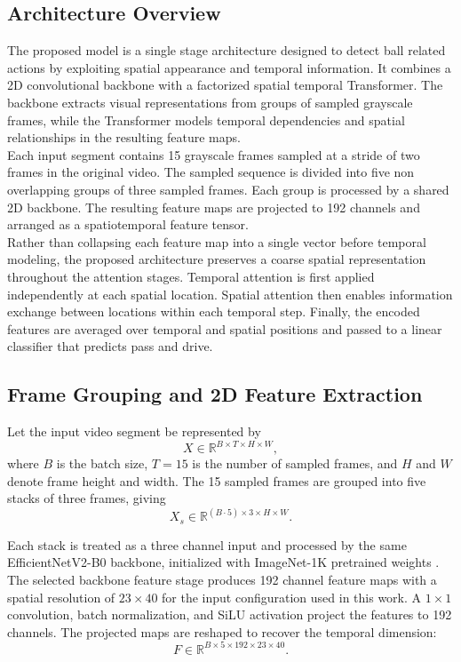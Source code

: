 \documentclass[conference]{IEEEtran}
\begin{document}
\subsection{Architecture Overview}
The proposed model is a single stage architecture designed to detect ball related actions by exploiting spatial appearance and temporal information. It combines a 2D convolutional backbone with a factorized spatial temporal Transformer. The backbone extracts visual representations from groups of sampled grayscale frames, while the Transformer models temporal dependencies and spatial relationships in the resulting feature maps.\\
Each input segment contains 15 grayscale frames sampled at a stride of two frames in the original video. The sampled sequence is divided into five non overlapping groups of three sampled frames. Each group is processed by a shared 2D backbone. The resulting feature maps are projected to 192 channels and arranged as a spatiotemporal feature tensor.\\
Rather than collapsing each feature map into a single vector before temporal modeling, the proposed architecture preserves a coarse spatial representation throughout the attention stages. Temporal attention is first applied independently at each spatial location. Spatial attention then enables information exchange between locations within each temporal step. Finally, the encoded features are averaged over temporal and spatial positions and passed to a linear classifier that predicts pass and drive.

\subsection{Frame Grouping and 2D Feature Extraction}
Let the input video segment be represented by
\[
X \in \mathbb{R}^{B \times T \times H \times W},
\]
where $B$ is the batch size, $T=15$ is the number of sampled frames, and $H$ and $W$ denote frame height and width. The 15 sampled frames are grouped into five stacks of three frames, giving
\[
X_s \in \mathbb{R}^{(B\cdot 5)\times 3\times H\times W}.
\]

Each stack is treated as a three channel input and processed by the same EfficientNetV2-B0 backbone, initialized with ImageNet-1K pretrained weights \cite{tan2021efficientnetv2smallermodelsfaster}. The selected backbone feature stage produces 192 channel feature maps with a spatial resolution of $23\times40$ for the input configuration used in this work. A $1\times1$ convolution, batch normalization, and SiLU activation project the features to 192 channels. The projected maps are reshaped to recover the temporal dimension:
\[
F\in\mathbb{R}^{B\times5\times192\times23\times40}.
\]
\end{document}
